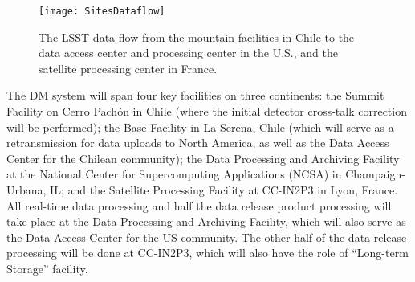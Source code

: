 
\begin{figure*}
\hskip 0.01in
\texttt{[image: SitesDataflow]}
\caption{The LSST data flow from the mountain facilities in
Chile to the data access center and processing center in the U.S., and
the satellite processing center in France.}
\label{Fig:DM2}
\end{figure*}

The DM system will span four key facilities on three continents: the Summit
Facility on Cerro Pach\'on in Chile (where the initial detector cross-talk correction
will be performed); the Base Facility in La Serena, Chile (which will serve as a retransmission
for data uploads to North America, as well as the Data Access Center for the Chilean community);
the Data Processing and Archiving Facility at the National Center for Supercomputing Applications
(NCSA) in Champaign-Urbana, IL; and the Satellite Processing Facility at CC-IN2P3 in Lyon, France.
All real-time data processing and half the data release product processing will take place at the
Data Processing and Archiving Facility, which will also serve as the Data Access Center for the US
community. The other half of the data release processing will be done at CC-IN2P3, which
will also have the role of ``Long-term Storage'' facility.

